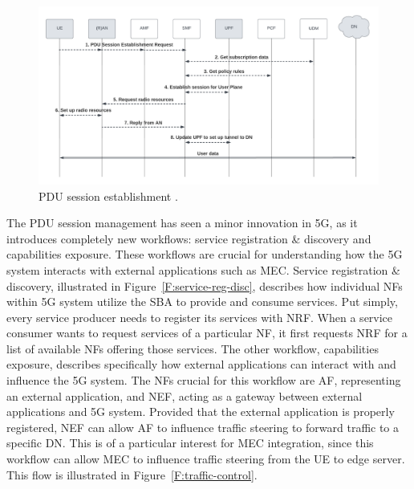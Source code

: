 \documentclass[12pt,a4paper,twoside]{report}
\begin{document}
\begin{figure}[ht]
	\centering
	\includegraphics[width=\textwidth]{./images/PDU-sesh-est.png}
	\caption{PDU session establishment \cite{rommer20195g}.}
	\label{F:PDU-est}
\end{figure}

The PDU session management has seen a minor innovation in 5G, as it introduces completely new workflows: service registration \& discovery and capabilities exposure. These workflows are crucial for understanding how the 5G system interacts with external applications such as MEC. Service registration \& discovery, illustrated in Figure~\ref{F:service-reg-disc}, describes how individual NFs within 5G system utilize the SBA to provide and consume services. Put simply, every service producer needs to register its services with NRF. When a service consumer wants to request services of a particular NF, it first requests NRF for a list of available NFs offering those services. The other workflow, capabilities exposure, describes specifically how external applications can interact with and influence the 5G system. The NFs crucial for this workflow are AF, representing an external application, and NEF, acting as a gateway between external applications and 5G system. Provided that the external application is properly registered, NEF can allow AF to influence traffic steering to forward traffic to a specific DN. This is of a particular interest for MEC integration, since this workflow can allow MEC to influence traffic steering from the UE to edge server. This flow is illustrated in Figure~\ref{F:traffic-control}. \cite{rommer20195g}
\end{document}
